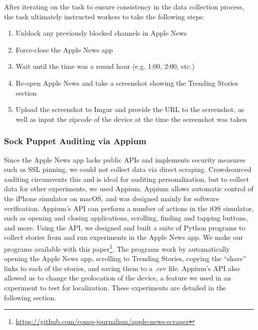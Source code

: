 After iterating on the task to ensure consistency in the data collection process, the task ultimately instructed workers to take the following steps: 

\begin{enumerate}
\item Unblock any previously blocked channels in Apple News
\item Force-close the Apple News app
\item Wait until the time was a round hour (e.g. 1:00, 2:00, etc.)
\item Re-open Apple News and take a screenshot showing the Trending Stories section
\item Upload the screenshot to Imgur and provide the URL to the screenshot, as well as input the zipcode of the device at the time the screenshot was taken

\end{enumerate}

\subsubsection{Sock Puppet Auditing via Appium}
Since the Apple News app lacks public APIs and implements security measures such as SSL pinning, we could not collect data via direct scraping. Crowdsourced auditing circumvents this and is ideal for auditing personalization, but to collect data for other experiments, we used Appium. Appium allows automatic control of the iPhone simulator on macOS, and was designed mainly for software verification. Appium's API can perform a number of actions in the iOS simulator, such as opening and closing applications, scrolling, finding and tapping buttons, and more. Using the API, we designed and built a suite of Python programs to collect stories from and run experiments in the Apple News app. We make our programs available with this paper\footnote{\url{https://github.com/comp-journalism/apple-news-scraper}}. The programs work by automatically opening the Apple News app, scrolling to Trending Stories, copying the ``share'' links to each of the stories, and saving them to a .csv file. Appium's API also allowed us to change the geolocation of the device, a feature we used in an experiment to test for localization. These experiments are detailed in the following section.

